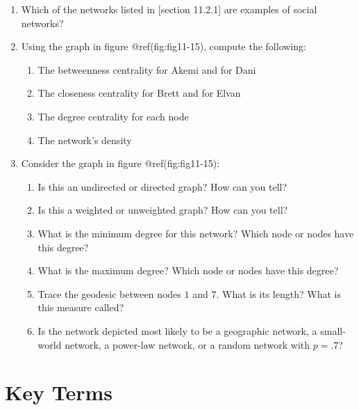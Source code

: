 \documentclass{book}
\begin{document}
\begin{enumerate}
\def\labelenumi{\arabic{enumi}.}
\item
  Which of the networks listed in {[}section 11.2.1{]} are examples of social
  networks?
\item
  Using the graph in figure @ref(fig:fig11-15), compute the following:

  \begin{enumerate}
  \def\labelenumii{\arabic{enumii}.}
  \item
    The betweenness centrality for Akemi and for Dani
  \item
    The closeness centrality for Brett and for Elvan
  \item
    The degree centrality for each node
  \item
    The network's density
  \end{enumerate}
\item
  Consider the graph in figure @ref(fig:fig11-15):

  \begin{enumerate}
  \def\labelenumii{\arabic{enumii}.}
  \item
    Is this an undirected or directed graph? How can you tell?
  \item
    Is this a weighted or unweighted graph? How can you tell?
  \item
    What is the minimum degree for this network? Which node or nodes have this
    degree?
  \item
    What is the maximum degree? Which node or nodes have this degree?
  \item
    Trace the geodesic between nodes \(1\) and \(7\). What is its length? What
    is this measure called?
  \item
    Is the network depicted most likely to be a geographic network, a
    small-world network, a power-law network, or a random network with
    \(p = .7\)?
  \end{enumerate}
\end{enumerate}

\hypertarget{key-terms-6}{%
\section{Key Terms}\label{key-terms-6}}
\end{document}
